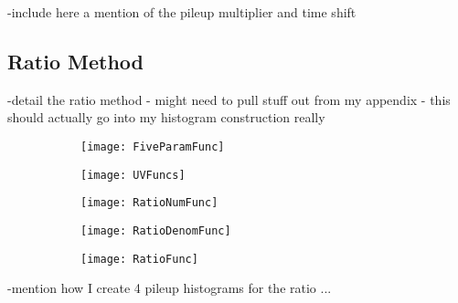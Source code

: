 -include here a mention of the pileup multiplier and time shift








\subsection{Ratio Method}

-detail the ratio method - might need to pull stuff out from my appendix - this should actually go into my histogram construction really


    \begin{figure}[]
    \centering
        \begin{subfigure}[t]{0.45\textwidth}
            \centering
            \texttt{[image: FiveParamFunc]}
            \caption{}
        \end{subfigure}%

        \vspace{2mm}
        \begin{subfigure}[t]{0.45\textwidth}
            \centering
            \texttt{[image: UVFuncs]}
            \caption{}
        \end{subfigure}
        \begin{subfigure}[t]{0.45\textwidth}
            \centering
            \texttt{[image: RatioNumFunc]}
            \caption{}
        \end{subfigure}%
        \vspace{2mm}
        \begin{subfigure}[t]{0.45\textwidth}
            \centering
            \texttt{[image: RatioDenomFunc]}
            \caption{}
        \end{subfigure}
        \begin{subfigure}[t]{0.45\textwidth}
            \centering
            \texttt{[image: RatioFunc]}
            \caption{}
        \end{subfigure}%
    \caption[]{}
    \label{}
    \end{figure}



-mention how I create 4 pileup histograms for the ratio ...




